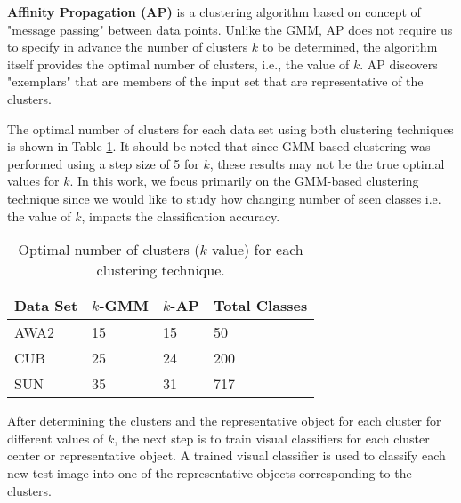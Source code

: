 \par
\medskip

\textbf{Affinity Propagation (AP)} is a clustering algorithm based on concept of "message passing" between data points. Unlike the GMM, AP does not require us to specify in advance the number of clusters $k$ to be determined, the algorithm itself provides the optimal number of clusters, i.e., the value of $k$. AP discovers "exemplars" that are members of the input set that are representative of the clusters.

\par
\medskip

The optimal number of clusters for each data set using both clustering techniques is shown in Table \ref{table:k_cl}. It should be noted that since GMM-based clustering was performed using a step size of 5 for $k$, these results may not be the true optimal values for $k$. In this work, we focus primarily on the GMM-based clustering technique since we would like to study how changing number of seen classes i.e. the value of $k$, impacts the classification accuracy.

\par
\medskip

\begin{table}[h!]
\begin{center}
\caption{Optimal number of clusters ($k$ value) for each clustering technique.}
\begin{tabular}{llll}
\hline
\textbf{Data Set} & \textbf{$k$-GMM} & \textbf{$k$-AP} & \textbf{Total Classes} \\ \hline
AWA2 & 15 & 15 & 50\\
CUB & 25 & 24 & 200\\
SUN & 35 & 31 & 717\\ \hline
\end{tabular}
\label{table:k_cl}
\end{center}
\end{table}

\par
\medskip


After determining the clusters and the representative object for each cluster for different values of $k$, the next step is to train visual classifiers for each cluster center or representative object. A trained visual classifier is used to classify each new test image into one of the representative objects corresponding to the clusters.

